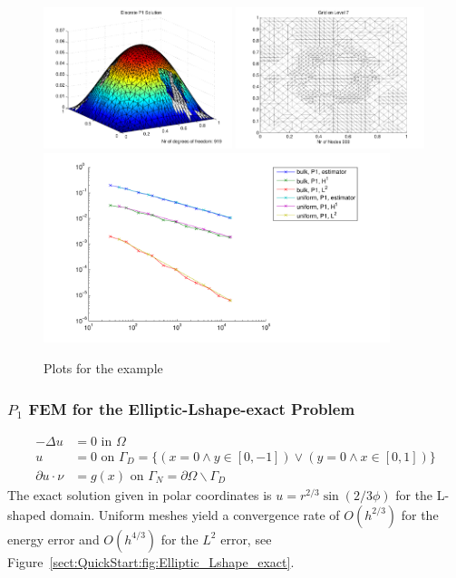 \begin{figure}[ht!]
\includegraphics[width= 0.49\textwidth]{images/sect_QuickStart_Elliptic_Square_exact_U}
\includegraphics[width= 0.49\textwidth]{images/sect_QuickStart_Elliptic_Square_exact_Mesh}\bigskip\\
\includegraphics[width=0.9\textwidth]{images/sect_QuickStart_Elliptic_Square_exact_Error}
\caption{ Plots for the example }
\label{sect:QuickStart:fig:Elliptic_Square_exact}
\end{figure}

\clearpage

\subsubsection{$P_1$ FEM for the Elliptic-Lshape-exact Problem}
\begin{align*}
-\Delta u &= 0 \textrm{ in } \Omega\\
 u &= 0 \textrm{ on } \Gamma_D =\{ (x=0 \wedge y\in[0,-1]) \vee (y=0 \wedge x\in[0,1])\}\\
 \partial u \cdot \nu &= g(x) \textrm{ on } \Gamma_N = \partial\Omega\backslash\Gamma_D
\end{align*}
The exact solution given in polar coordinates is $u=r^{2/3}\sin(2/3\phi)$ for  the L-shaped domain. 
Uniform meshes yield a convergence rate of $O(h^{2/3})$ for the energy error and $O(h^{4/3})$ for the $L^2$ error,
see Figure~\ref{sect:QuickStart:fig:Elliptic_Lshape_exact}.\bigskip

